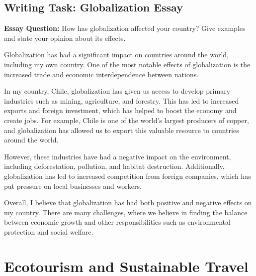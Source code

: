 \subsection{Writing Task: Globalization Essay}

\textbf{Essay Question:} How has globalization affected your country? Give examples and state your opinion about its effects.

\begin{tcolorbox}[colback=green!5, colframe=green!30, title=Sample Essay: Globalization in Chile]
Globalization has had a significant impact on countries around the world, including my own country. One of the most notable effects of globalization is the increased trade and economic interdependence between nations.

In my country, Chile, globalization has given us access to develop primary industries such as mining, agriculture, and forestry. This has led to increased exports and foreign investment, which has helped to boost the economy and create jobs. For example, Chile is one of the world's largest producers of copper, and globalization has allowed us to export this valuable resource to countries around the world.

However, these industries have had a negative impact on the environment, including deforestation, pollution, and habitat destruction. Additionally, globalization has led to increased competition from foreign companies, which has put pressure on local businesses and workers.

Overall, I believe that globalization has had both positive and negative effects on my country. There are many challenges, where we believe in finding the balance between economic growth and other responsibilities such as environmental protection and social welfare.
\end{tcolorbox}

\section{Ecotourism and Sustainable Travel}

